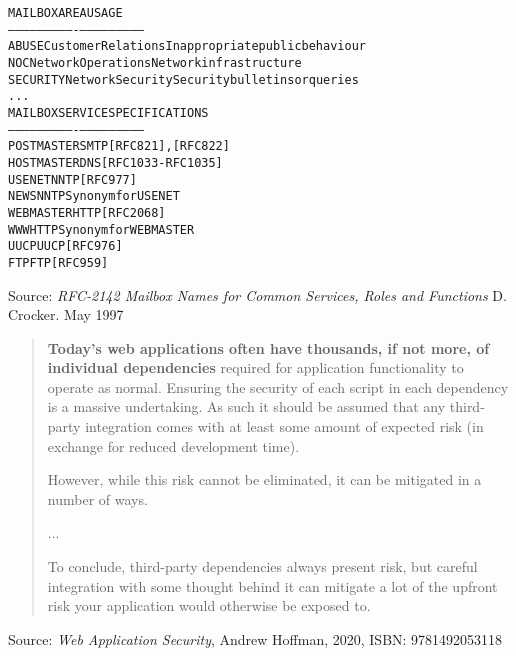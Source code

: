 \documentclass[Screen16to9,17pt]{foils}
\begin{document}
\begin{alltt}\small
MAILBOX       AREA                USAGE
-----------   ----------------    ---------------------------
ABUSE         Customer Relations  Inappropriate public behaviour
NOC           Network Operations  Network infrastructure
SECURITY      Network Security    Security bulletins or queries
...
MAILBOX       SERVICE             SPECIFICATIONS
-----------   ----------------    ---------------------------
POSTMASTER    SMTP                [RFC821], [RFC822]
HOSTMASTER    DNS                 [RFC1033-RFC1035]
USENET        NNTP                [RFC977]
NEWS          NNTP                Synonym for USENET
WEBMASTER     HTTP                [RFC 2068]
WWW           HTTP                Synonym for WEBMASTER
UUCP          UUCP                [RFC976]
FTP           FTP                 [RFC959]
\end{alltt}

Source:
\emph{RFC-2142 Mailbox Names for Common Services, Roles and Functions} D.
Crocker. May 1997







\begin{quote}{\bf
Today’s web applications often have thousands, if not more, of individual dependencies} required for application functionality to operate as normal. Ensuring the security of each script in each dependency is a massive undertaking. As such it should be assumed that any third-party integration comes with at least some amount of
expected risk (in exchange for reduced development time).

However, while this risk cannot be eliminated, it can be mitigated in a number of ways.

...

To conclude, third-party dependencies always present risk, but careful integration
with some thought behind it can mitigate a lot of the upfront risk your application
would otherwise be exposed to.
\end{quote}

Source: \emph{Web Application Security}, Andrew Hoffman, 2020, ISBN: 9781492053118




\end{document}
